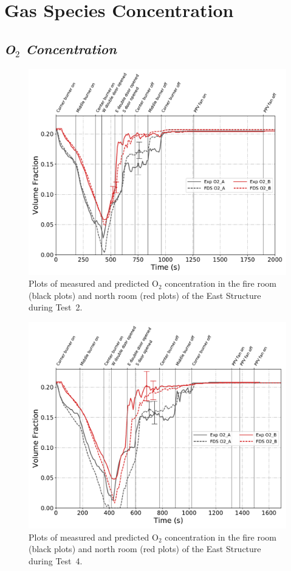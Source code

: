 \clearpage
\section{Gas Species Concentration}
\subsection*{\textit{O$_2$ Concentration}}
\begin{figure}[!h]
	\centering
	\includegraphics[width=\columnwidth]{Figures/Plots/Validation/Gas_Concentration/Test_2_O2}
	\caption[Plots of measured and predicted O$_2$ concentration during Test~2.]{Plots of measured and predicted O$_2$ concentration in the fire room (black plots) and north room (red plots) of the East Structure during Test~2.}
	\label{fig:Test2_O2}
\end{figure}

\begin{figure}[!h]
	\centering
	\includegraphics[width=\columnwidth]{Figures/Plots/Validation/Gas_Concentration/Test_4_O2}
	\caption[Plots of measured and predicted O$_2$ concentration during Test~4.]{Plots of measured and predicted O$_2$ concentration in the fire room (black plots) and north room (red plots) of the East Structure during Test~4.}
	\label{fig:Test4_O2}
\end{figure}

